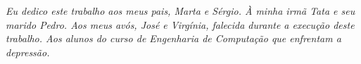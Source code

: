 \emph{Eu dedico este trabalho aos meus pais, Marta e Sérgio. À minha irmã Tata e seu marido Pedro. Aos meus avós, José e Virgínia, falecida durante a execução deste trabalho. Aos alunos do curso de Engenharia de Computação que enfrentam a depressão.
}
